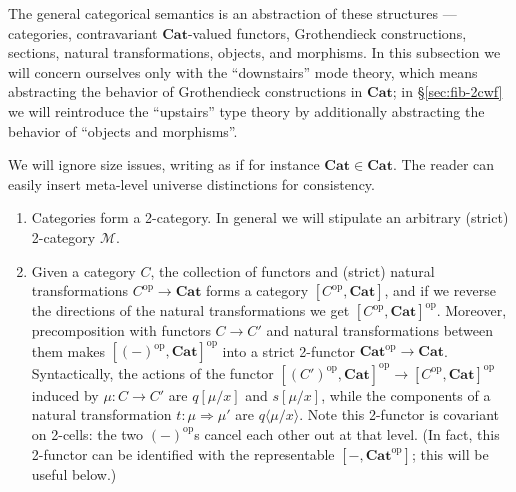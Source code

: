 \documentclass[10pt]{article}
\theoremstyle{definition}
\newcommand\ap[2]{\ensuremath{#1 \langle #2 \rangle }}
\newcommand\op{^{\mathrm{op}}}
\newcommand\Cat{\mathbf{Cat}}
\newcommand\M{\mathcal{M}}
\begin{document}
The general categorical semantics is an abstraction of these structures --- categories, contravariant $\Cat$-valued functors, Grothendieck constructions, sections, natural transformations, objects, and morphisms.
In this subsection we will concern ourselves only with the ``downstairs'' mode theory, which means abstracting the behavior of Grothendieck constructions in $\Cat$; in \S\ref{sec:fib-2cwf} we will reintroduce the ``upstairs'' type theory by additionally abstracting the behavior of ``objects and morphisms''.

We will ignore size issues, writing as if for instance $\Cat\in\Cat$.
The reader can easily insert meta-level universe distinctions for consistency.

\begin{enumerate}
\item Categories form a 2-category.
  In general we will stipulate an arbitrary (strict) 2-category $\M$.
\item Given a category $C$, the collection of functors and (strict) natural transformations $C\op \to \Cat$ forms a category $[C\op, \Cat]$, and if we reverse the directions of the natural transformations we get $[C\op, \Cat]\op$.
  Moreover, precomposition with functors $C\to C'$ and natural transformations between them makes $[(-)\op, \Cat]\op$ into a strict 2-functor $\Cat\op \to \Cat$.
  Syntactically, the actions of the functor $[(C')\op, \Cat]\op \to [C\op,\Cat]\op$ induced by $\mu:C\to C'$ are $q[\mu/x]$ and $s[\mu/x]$, while the components of a natural transformation $t:\mu\Rightarrow\mu'$ are $\ap{q}{\mu/x}$.
  Note this 2-functor is covariant on 2-cells: the two $(-)\op$s cancel each other out at that level.
  (In fact, this 2-functor can be identified with the representable $[-,\Cat\op]$; this will be useful below.)


\end{enumerate}
\end{document}
